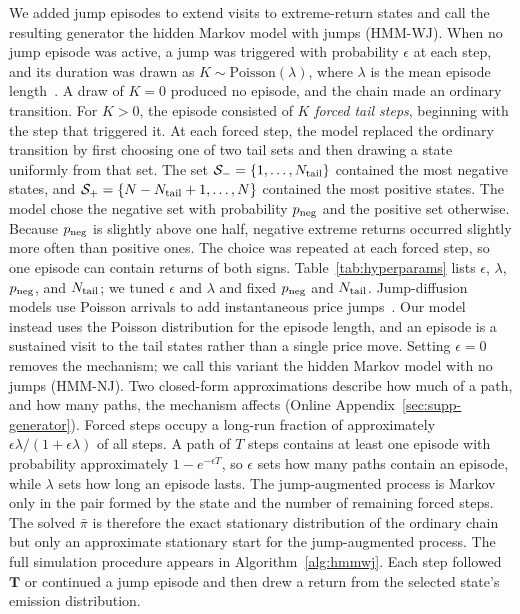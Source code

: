 We added jump episodes to extend visits to extreme-return states and
call the resulting generator the hidden Markov model with jumps
(HMM-WJ).
When no jump episode was active, a jump was triggered with
probability $\epsilon$ at each step, and its duration was drawn as
$K\sim\mathrm{Poisson}(\lambda)$, where $\lambda$ is the mean episode
length~\cite{glasserman2003}. A draw of $K=0$ produced no episode,
and the chain made an ordinary transition. For $K>0$, the episode
consisted of $K$ \emph{forced tail steps}, beginning with the step
that triggered it. At each forced step, the model replaced the
ordinary transition by first choosing one of two tail sets and then
drawing a state uniformly from that set. The set
$\mathcal{S}_{-}=\{1,\dots,N_{\rm tail}\}$ contained the most negative
states, and $\mathcal{S}_{+}=\{N-N_{\rm tail}+1,\dots,N\}$ contained the
most positive states. The model chose the negative set with
probability $p_{\rm neg}$ and the positive set otherwise. Because
$p_{\rm neg}$ is slightly above one half, negative extreme returns
occurred slightly more often than positive ones. The choice was
repeated at each forced step, so one episode can contain
returns of both signs. Table~\ref{tab:hyperparams} lists $\epsilon$, $\lambda$,
$p_{\rm neg}$, and $N_{\rm tail}$; we tuned $\epsilon$ and $\lambda$
and fixed $p_{\rm neg}$ and $N_{\rm tail}$. Jump-diffusion models
use Poisson arrivals to add instantaneous price
jumps~\cite{merton1976, kou2002}. Our model instead uses the Poisson distribution for the episode
length, and an episode is a
sustained visit to the tail states rather than a single price move.
Setting $\epsilon=0$ removes the mechanism; we call this variant the
hidden Markov model with no jumps (HMM-NJ). Two closed-form approximations describe how much of a path, and how
many paths, the mechanism affects (Online
Appendix~\ref{sec:supp-generator}). Forced steps occupy a long-run
fraction of approximately $\epsilon\lambda/(1+\epsilon\lambda)$ of all
steps. A path of $T$ steps contains at least one episode with
probability approximately $1 - e^{-\epsilon T}$, so $\epsilon$ sets
how many paths contain an episode, while $\lambda$ sets how long an
episode lasts. The jump-augmented process is Markov only in the pair
formed by the state and the number of remaining forced steps. The solved $\bar{\pi}$ is therefore the exact stationary distribution
of the ordinary chain but only an approximate stationary start for
the jump-augmented process. The full simulation
procedure appears in Algorithm~\ref{alg:hmmwj}. Each step followed
$\mathbf{T}$ or continued a jump episode and then drew a return from
the selected state's emission distribution.

